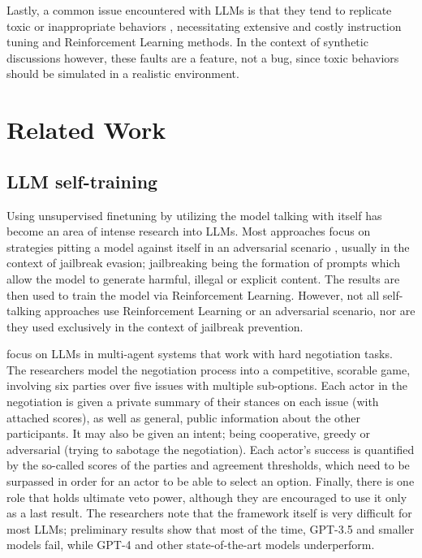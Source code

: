 Lastly, a common issue encountered with LLMs is that they tend to replicate toxic or inappropriate behaviors \cite{Birkun_Gautam_2023}, necessitating extensive and costly instruction tuning and Reinforcement Learning methods. In the context of synthetic discussions however, these faults are a feature, not a bug, since toxic behaviors should be simulated in a realistic environment.

\section{Related Work}
\label{sec:related:sec2}

\subsection{LLM self-training}
\label{sec:related:self-train}

Using unsupervised finetuning by utilizing the model talking with itself has become an area of intense research into LLMs. Most approaches focus on strategies pitting a model against itself in an adversarial scenario \cite{liu2024largelanguagemodelsagents, cheng2024selfplayingadversariallanguagegame, zheng2024optimalllmalignmentsusing}, usually in the context of jailbreak evasion; jailbreaking being the formation of prompts which allow the model to generate harmful, illegal or explicit content. The results are then used to train the model via Reinforcement Learning. However, not all self-talking approaches use Reinforcement Learning or an adversarial scenario, nor are they used exclusively in the context of jailbreak prevention.  

\cite{abdelnabi2024cooperationcompetitionmaliciousnessllmstakeholders} focus on LLMs in multi-agent systems that work with hard negotiation tasks. The researchers model the negotiation process into a competitive, scorable game, involving six parties over five issues with multiple sub-options. Each actor in the negotiation is given a private summary of their stances on each issue (with attached scores), as well as general, public information about the other participants. It may also be given an intent; being cooperative, greedy or adversarial (trying to sabotage the negotiation). Each actor's success is quantified by the so-called scores of the parties and agreement thresholds, which need to be surpassed in order for an actor to be able to select an option. Finally, there is one role that holds ultimate veto power, although they are encouraged to use it only as a last result. The researchers note that the framework itself is very difficult for most LLMs; preliminary results show that most of the time, GPT-3.5 and smaller models fail, while GPT-4 and other state-of-the-art models underperform.

